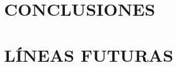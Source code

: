 \documentclass[a4paper, 12pt, spanish, twoside]{article}
\begin{document}

\newpage
\section{CONCLUSIONES} \label{sec:conclusiones}

\clearpage





\newpage
\section{LÍNEAS FUTURAS} \label{sec:lineas_futuras}

\clearpage





\newpage
\appto{\bibsetup}{\sloppy}
\printbibliography[heading=bibintoc, title=BIBLIOGRAFÍA] %

\clearpage










\newpage
\end{document}
